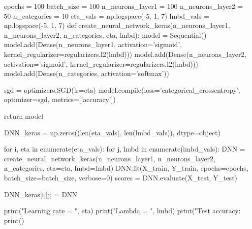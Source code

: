 \documentclass[%
oneside,                 %
final,                   %
10pt]{article}
\begin{document}
\epycod





















\bpycod

epochs = 100
batch_size = 100
n_neurons_layer1 = 100
n_neurons_layer2 = 50
n_categories = 10
eta_vals = np.logspace(-5, 1, 7)
lmbd_vals = np.logspace(-5, 1, 7)
def create_neural_network_keras(n_neurons_layer1, n_neurons_layer2, n_categories, eta, lmbd):
    model = Sequential()
    model.add(Dense(n_neurons_layer1, activation='sigmoid', kernel_regularizer=regularizers.l2(lmbd)))
    model.add(Dense(n_neurons_layer2, activation='sigmoid', kernel_regularizer=regularizers.l2(lmbd)))
    model.add(Dense(n_categories, activation='softmax'))
    
    sgd = optimizers.SGD(lr=eta)
    model.compile(loss='categorical_crossentropy', optimizer=sgd, metrics=['accuracy'])
    
    return model

\epycod


















\bpycod
DNN_keras = np.zeros((len(eta_vals), len(lmbd_vals)), dtype=object)
        
for i, eta in enumerate(eta_vals):
    for j, lmbd in enumerate(lmbd_vals):
        DNN = create_neural_network_keras(n_neurons_layer1, n_neurons_layer2, n_categories,
                                         eta=eta, lmbd=lmbd)
        DNN.fit(X_train, Y_train, epochs=epochs, batch_size=batch_size, verbose=0)
        scores = DNN.evaluate(X_test, Y_test)
        
        DNN_keras[i][j] = DNN
        
        print("Learning rate = ", eta)
        print("Lambda = ", lmbd)
        print("Test accuracy: %
        print()

\epycod
\end{document}

